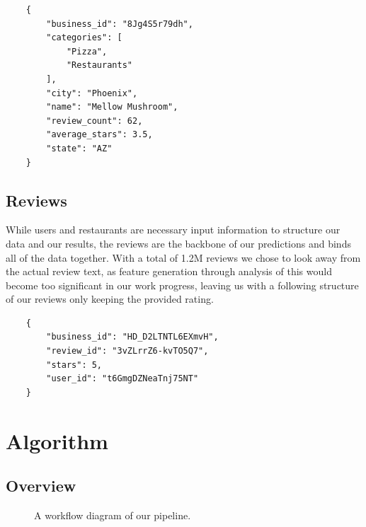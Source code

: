 \documentclass[10pt,twocolumn,letterpaper]{article}
\begin{document}
\begin{verbatim}
	{
	    "business_id": "8Jg4S5r79dh",
	    "categories": [
	        "Pizza",
	        "Restaurants"
	    ],
	    "city": "Phoenix",
	    "name": "Mellow Mushroom",
	    "review_count": 62,
	    "average_stars": 3.5,
	    "state": "AZ"
	}
\end{verbatim}

\subsection{Reviews}
While users and restaurants are necessary input information to structure our data and our results, the reviews are the backbone of our predictions and binds all of the data together. With a total of 1.2M reviews we chose to look away from the actual review text, as feature generation through analysis of this would become too significant in our work progress, leaving us with a following structure of our reviews only keeping the provided rating.

\begin{verbatim}
	{
	    "business_id": "HD_D2LTNTL6EXmvH",
	    "review_id": "3vZLrrZ6-kvTO5Q7",
	    "stars": 5,
	    "user_id": "t6GmgDZNeaTnj75NT"
	}
\end{verbatim}


\section{Algorithm}

\subsection{Overview}
\begin{figure}[t]
\begin{center}
\end{center}
   \caption{A workflow diagram of our pipeline.}
\label{fig:long}
\label{fig:onecol}
\end{figure}
\end{document}
